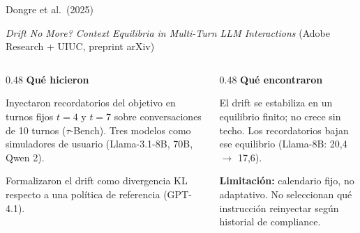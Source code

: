 \documentclass[aspectratio=169, 11pt]{beamer}
\begin{document}
\begin{frame}{Dongre et al.\ (2025)}

\textit{Drift No More? Context Equilibria in Multi-Turn LLM Interactions} (Adobe Research + UIUC, preprint arXiv)

\vspace{0.6em}

\begin{columns}[T]
\begin{column}{0.48\textwidth}
\textbf{Qu\'e hicieron}

\vspace{0.3em}
\footnotesize
Inyectaron recordatorios del objetivo en \alert{turnos fijos $t=4$ y $t=7$} sobre conversaciones de 10 turnos ($\tau$-Bench). Tres modelos como simuladores de usuario (Llama-3.1-8B, 70B, Qwen 2).

\vspace{0.4em}

Formalizaron el drift como divergencia KL respecto a una pol\'itica de referencia (GPT-4.1).
\end{column}

\begin{column}{0.48\textwidth}
\textbf{Qu\'e encontraron}

\vspace{0.3em}
\footnotesize
El drift se \alert{estabiliza en un equilibrio finito}; no crece sin techo. Los recordatorios bajan ese equilibrio (Llama-8B: 20,4 $\to$ 17,6).

\vspace{0.6em}

\textbf{Limitaci\'on:} calendario fijo, no adaptativo. No seleccionan qu\'e instrucci\'on reinyectar seg\'un historial de compliance.
\end{column}
\end{columns}

\end{frame}
\end{document}
